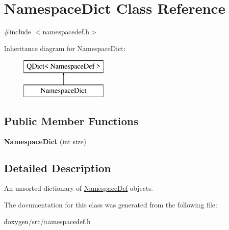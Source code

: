 \hypertarget{class_namespace_dict}{}\section{Namespace\+Dict Class Reference}
\label{class_namespace_dict}


{\ttfamily \#include $<$namespacedef.\+h$>$}

Inheritance diagram for Namespace\+Dict\+:\begin{figure}[H]
\begin{center}
\leavevmode
\includegraphics[height=2.000000cm]{class_namespace_dict}
\end{center}
\end{figure}
\subsection*{Public Member Functions}
\begin{DoxyCompactItemize}
\item 
\mbox{\label{class_namespace_dict_a6e3a90939469fd305374035f78506935}} 
{\bfseries Namespace\+Dict} (int size)
\end{DoxyCompactItemize}


\subsection{Detailed Description}
An unsorted dictionary of \mbox{\hyperlink{class_namespace_def}{Namespace\+Def}} objects. 

The documentation for this class was generated from the following file\+:\begin{DoxyCompactItemize}
\item 
doxygen/src/namespacedef.\+h\end{DoxyCompactItemize}
